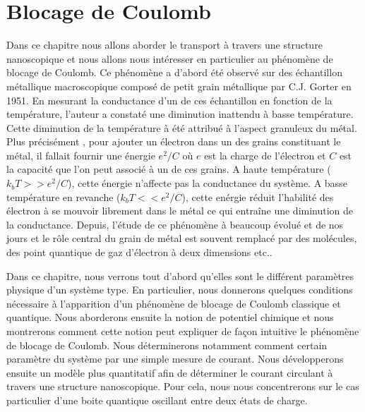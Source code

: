 

\chapter{Blocage de Coulomb}

Dans ce chapitre nous allons aborder le transport à travers une structure nanoscopique et nous allons nous intéresser en particulier au phénomène de blocage de Coulomb. Ce phénomène a d'abord été observé sur des échantillon métallique macroscopique composé de petit grain métallique par C.J. Gorter en 1951. En mesurant la conductance d'un de ces échantillon en fonction de la température, l'auteur a constaté une diminution inattendu à basse température. Cette diminution de la température à été attribué à l'aspect granuleux du métal. Plus précisément , pour ajouter un électron dans un des grains constituant le métal, il fallait fournir une énergie $e^2/C$ où $e$ est la charge de l'électron et $C$ est la capacité que l'on peut associé à un de ces grains. A haute température ($k_bT >> e^2/C$), cette énergie n'affecte pas la conductance du système. A basse température en revanche ($k_bT << e^2/C$), cette enérgie réduit l'habilité des électron à se mouvoir librement dans le métal ce qui entraîne une diminution de la conductance. Depuis, l'étude de ce phénomène à beaucoup évolué et de nos jours et le rôle central du grain de métal est souvent remplacé par des molécules, des point quantique de gaz d'électron à deux dimensions etc..

Dans ce chapitre, nous verrons tout d'abord qu'elles sont le différent paramètres physique d'un système type. En particulier, nous donnerons quelques conditions nécessaire à l'apparition d'un phénomène de blocage de Coulomb classique et quantique. Nous aborderons ensuite la notion de potentiel chimique et nous montrerons comment cette notion peut expliquer de façon intuitive le phénomène de blocage de Coulomb. Nous déterminerons notamment comment certain paramètre du système par une simple mesure de courant. Nous développerons ensuite un modèle plus quantitatif afin de déterminer le courant circulant à travers une structure nanoscopique. Pour cela, nous nous concentrerons sur le cas particulier d'une boite quantique oscillant entre deux états de charge.


